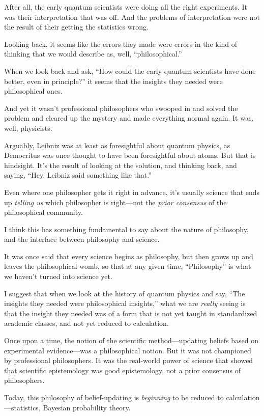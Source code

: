 {
 After all, the early quantum scientists were doing all the right
experiments. It was their interpretation that was off. And the problems
of interpretation were not the result of their getting the statistics
wrong.}

{
 Looking back, it seems like the errors they made were errors in
the kind of thinking that we would describe as, well,
``philosophical.''}

{
 When we look back and ask, ``How could the early
quantum scientists have done better, even in
principle?'' it seems that the insights they needed
were philosophical ones.}

{
 And yet it wasn't professional philosophers who
swooped in and solved the problem and cleared up the mystery and made
everything normal again. It was, well, physicists.}

{
 Arguably, Leibniz was at least as foresightful about quantum
physics, as Democritus was once thought to have been foresightful about
atoms. But that is hindsight. It's the result of
looking at the solution, and thinking back, and saying,
``Hey, Leibniz said something like
that.''}

{
 Even where one philosopher gets it right in advance,
it's usually science that ends up \textit{telling us}
which philosopher is right---not the \textit{prior consensus} of the
philosophical community.}

{
 I think this has something fundamental to say about the nature of
philosophy, and the interface between philosophy and science.}

{
 It was once said that every science begins as philosophy, but then
grows up and leaves the philosophical womb, so that at any given time,
``Philosophy'' is what we
haven't turned into science yet.}

{
 I suggest that when we look at the history of quantum physics and
say, ``The insights they needed were philosophical
insights,'' what we are \textit{really} seeing is
that the insight they needed was of a form that is not yet taught in
standardized academic classes, and not yet reduced to calculation.}

{
 Once upon a time, the notion of the scientific method---updating
beliefs based on experimental evidence---was a philosophical notion.
But it was not championed by professional philosophers. It was the
real-world power of science that showed that scientific epistemology
was good epistemology, not a prior consensus of philosophers.}

{
 Today, this philosophy of belief-updating is \textit{beginning} to
be reduced to calculation---statistics, Bayesian probability theory.}

